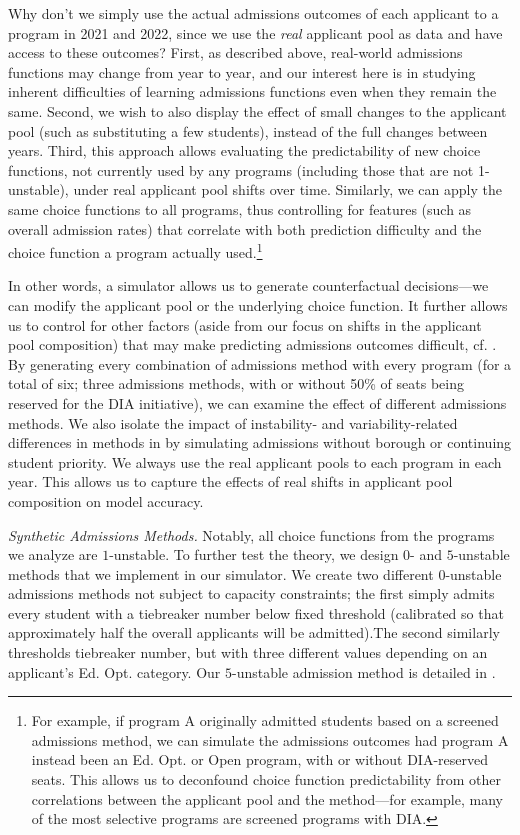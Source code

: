 \documentclass[letterpaper]{article}
\begin{document}
Why don't we simply use the actual admissions outcomes of each applicant to a program in 2021 and 2022, since we use the \textit{real} applicant pool as data and have access to these outcomes? First, as described above, real-world admissions functions may change from year to year, and our interest here is in studying inherent difficulties of learning admissions functions even when they remain the same. Second, we wish to also display the effect of small changes to the applicant pool (such as substituting a few students), instead of the full changes between years. Third, this approach allows evaluating the predictability of new choice functions, not currently used by any programs (including those that are not 1-unstable), under real applicant pool shifts over time. Similarly, we can apply the same choice functions to all programs, thus controlling for features (such as overall admission rates) that correlate with both prediction difficulty and the choice function a program actually used.\footnote{For example, if program A originally admitted students based on a screened admissions method, we can simulate the admissions outcomes had program A instead been an Ed. Opt. or Open program, with or without DIA-reserved seats. This allows us to deconfound choice function predictability from other correlations between the applicant pool and the method---for example, many of the most selective programs are screened programs with DIA.}

In other words, a simulator allows us to generate counterfactual decisions---we can modify the applicant pool or the underlying choice function. It further allows us to control for other factors (aside from our focus on shifts in the  applicant pool composition) that may make predicting admissions outcomes difficult, cf. \citet{wang2024against}. By generating every combination of admissions method with every program (for a total of six; three admissions methods, with or without 50\% of seats being reserved for the DIA initiative), we can examine the effect of different admissions methods. We also isolate the impact of instability- and variability-related differences in methods in  by simulating admissions without borough or continuing student priority.
We always use the real applicant pools to each program in each year.
This allows us to capture the effects of real shifts in applicant pool composition on model accuracy.

\textit{Synthetic Admissions Methods.}
Notably, all choice functions from the programs we analyze are $1$-unstable. To further test the theory, we design $0$- and $5$-unstable methods that we implement in our simulator. We create two different $0$-unstable admissions methods not subject to capacity constraints; the first simply admits every student with a tiebreaker number below fixed threshold (calibrated so that approximately half the overall applicants will be admitted).The second similarly thresholds tiebreaker number, but with three different values depending on an applicant's Ed. Opt. category. Our $5$-unstable admission method  is detailed in .
\end{document}
